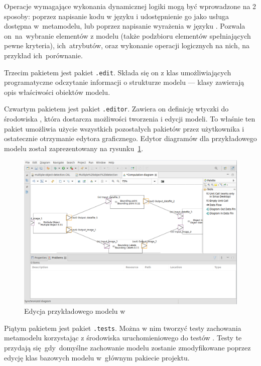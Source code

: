 Operacje wymagające wykonania dynamicznej logiki mogą być wprowadzone na 2
sposoby: poprzez napisanie kodu w języku \Java{} i udostępnienie go jako usługa
dostępna w~metamodelu, lub poprzez napisanie wyrażenia w języku .
Pozwala on~na~wybranie elementów z modelu (także podzbioru elementów
spełniających pewne kryteria), ich~atrybutów, oraz wykonanie operacji
logicznych na nich, na przykład ich~porównanie.

Trzecim pakietem jest pakiet \texttt{.edit}. Składa się on z klas
umożliwiających programatyczne odczytanie informacji o strukturze modelu ---
klasy zawierają opis właściwości obiektów modelu.

Czwartym pakietem jest pakiet \texttt{.editor}. Zawiera on definicję wtyczki do
środowiska \Eclipse{}, która dostarcza możliwości tworzenia i edycji
modeli. To właśnie ten pakiet umożliwia użycie wszystkich pozostałych pakietów
przez użytkownika i ostatecznie otrzymanie edytora graficznego. Edytor
diagramów dla przykładowego modelu został zaprezentowany na
rysunku~\ref{rys:sirius-desktop-example-model}.

\begin{figure}[!ht]
	\centering

	\includegraphics[width=0.95\linewidth]
	{./images/sirius-desktop-model-editor.png}
	\caption{Edycja przykładowego modelu w
		\SiriusDesktop{}}\label{rys:sirius-desktop-example-model}
\end{figure}

Piątym pakietem jest pakiet \texttt{.tests}. Można w nim tworzyć testy
zachowania metamodelu korzystając z środowiska uruchomieniowego do testów
\JUnit{}. Testy te przydają się~gdy~domyślne zachowanie modelu zostanie
zmodyfikowane poprzez edycję klas bazowych modelu w~głównym pakiecie projektu.

